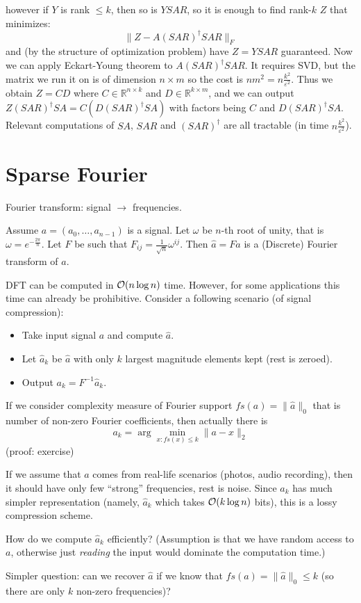 \documentclass[11pt]{article}
\begin{document}
however if $Y$ is rank $\le k$, then so is $YSAR$, so it is enough to find rank-$k$ $Z$ that minimizes:
$$\|Z - A (SAR)^\dagger SAR\|_F$$
and (by the structure of optimization problem) have $Z = YSAR$ guaranteed. Now we can apply Eckart-Young theorem to $A(SAR)^\dagger SAR$. It requires SVD, but the matrix we run it on is of dimension $n \times m$ so the cost is $n m^2 = n \frac{k^2}{\varepsilon^2}$. Thus we obtain $Z = C D$ where $C \in \mathbb{R}^{n \times k}$ and $D \in \mathbb{R}^{k\times m}$, and we can output
$Z(SAR)^\dagger SA = C (D (SAR)^\dagger SA)$ with factors being $C$ and $D (SAR)^\dagger SA$. Relevant computations of $SA$, $SAR$ and $ (SAR)^\dagger $ are all tractable (in time $n \frac{k^2}{\varepsilon^2}$).



\section{Sparse Fourier}
Fourier transform: signal $\to$ frequencies. 
\begin{definition}
Assume $a = (a_0,\ldots,a_{n-1})$ is a signal. Let $\omega$ be $n$-th root of unity, that is $\omega = e^{-\frac{2 \pi}{n}}$. Let $F$ be such that $F_{ij} = \frac{1}{\sqrt{n}}\omega^{ij}$. Then $\hat{a} = F a$ is a (Discrete) Fourier transform of $a$.
\end{definition}

DFT can be computed in $\mathcal{O}(n \log n)$ time. However, for some applications this time can already be prohibitive. Consider a following scenario (of signal compression):
\begin{itemize}
\item Take input signal $a$ and compute $\hat{a}$.
\item Let $\hat{a}_k$ be $\hat{a}$ with only $k$ largest magnitude elements kept (rest is zeroed).
\item Output $a_k = F^{-1} \hat{a}_k$.
\end{itemize}

If we consider complexity measure of Fourier support $fs(a) = \|\hat{a}\|_0$ that is number of non-zero Fourier coefficients, then actually there is
$$ a_k = \arg \min_{x : fs(x) \le k} \|a - x\|_2$$
(proof: exercise)

If we assume that $a$ comes from real-life scenarios (photos, audio recording), then it should have only few ``strong'' frequencies, rest is noise. Since $a_k$ has much simpler representation (namely, $\hat{a}_k$ which takes $\mathcal{O}(k \log n)$ bits), this is a lossy compression scheme.

How do we compute $\hat{a}_k$ efficiently? (Assumption is that we have random access to $a$, otherwise just \emph{reading} the input would dominate the computation time.)

Simpler question: can we recover $\hat{a}$ if we know that $fs(a) = \|\hat{a}\|_0 \le k$ (so there are only $k$ non-zero frequencies)?



\end{document}
